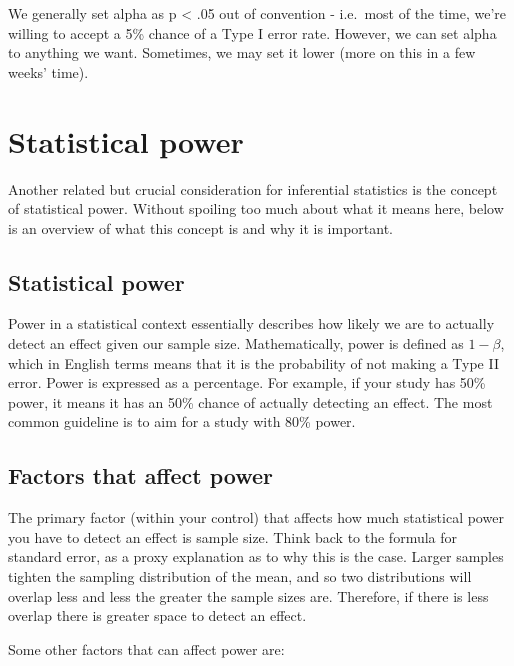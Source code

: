 \documentclass[
]{book}
\begin{document}
We generally set alpha as p \textless{} .05 out of convention - i.e.~most of the time, we're willing to accept a 5\% chance of a Type I error rate. However, we can set alpha to anything we want. Sometimes, we may set it lower (more on this in a few weeks' time).

\hypertarget{statistical-power}{%
\section{Statistical power}\label{statistical-power}}

Another related but crucial consideration for inferential statistics is the concept of statistical power. Without spoiling too much about what it means here, below is an overview of what this concept is and why it is important.

\hypertarget{statistical-power-1}{%
\subsection{Statistical power}\label{statistical-power-1}}

Power in a statistical context essentially describes how likely we are to actually detect an effect given our sample size. Mathematically, power is defined as \(1 - \beta\), which in English terms means that it is the probability of not making a Type II error. Power is expressed as a percentage. For example, if your study has 50\% power, it means it has an 50\% chance of actually detecting an effect. The most common guideline is to aim for a study with 80\% power.

\hypertarget{factors-that-affect-power}{%
\subsection{Factors that affect power}\label{factors-that-affect-power}}

The primary factor (within your control) that affects how much statistical power you have to detect an effect is sample size. Think back to the formula for standard error, as a proxy explanation as to why this is the case. Larger samples tighten the sampling distribution of the mean, and so two distributions will overlap less and less the greater the sample sizes are. Therefore, if there is less overlap there is greater space to detect an effect.

Some other factors that can affect power are:
\end{document}
